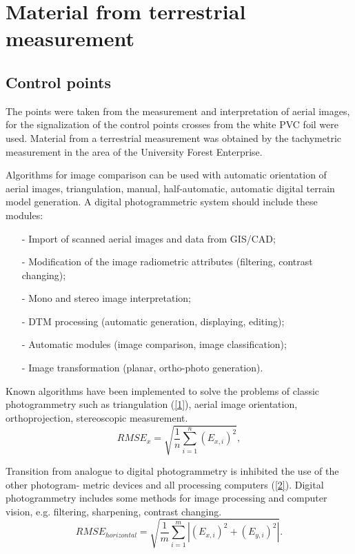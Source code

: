\documentclass[12pt]{spieman}
\begin{document}
 

\tableofcontents
\newpage
\section{Material from terrestrial measurement}
\subsection{Control points}
The points were taken from the measurement and interpretation of aerial
images, for the signalization of the control points crosses from the white PVC foil were used. Material from a terrestrial measurement was obtained by the tachymetric measurement in the area of the University Forest Enterprise.

Algorithms for image comparison can be used with automatic orientation  of aerial images, triangulation, manual, half-automatic, automatic digital terrain model generation. A digital photogrammetric system should include these modules:
\begin{itemize}
\item[-] Import of scanned aerial images and data from GIS/CAD; 
\item[-] Modification of the image radiometric attributes (filtering, contrast changing); 
\item[-] Mono and stereo image interpretation;
\item[-] DTM processing (automatic generation, displaying, editing); 
\item[-] Automatic modules (image comparison, image classification); 
\item[-] Image transformation (planar, ortho-photo generation). 
\end {itemize}

 Known algorithms have been implemented to solve the problems of classic photogrammetry such as triangulation (\ref{1}), aerial image orientation, orthoprojection, stereoscopic measurement.
 \begin{equation}
RMSE_{x}=\sqrt{\frac{1}{n}\sum\limits_{i=1}^n (E_{x,i})^2},\label{1}
  \end{equation}
  
  Transition from analogue to digital photogrammetry is inhibited the use of the other photogram- metric devices and all processing computers (\ref{2}). Digital photogrammetry includes some methods for image processing and computer vision, e.g. filtering, sharpening, contrast changing.
 \begin{equation}
  RMSE_{horizontal}=\sqrt{\frac{1}{m}\sum\limits_{i=1}^m |(E_{x,i})^2 +(E_{y,i})^2|}.\label{2}
 \end{equation}
 
\end{document}
